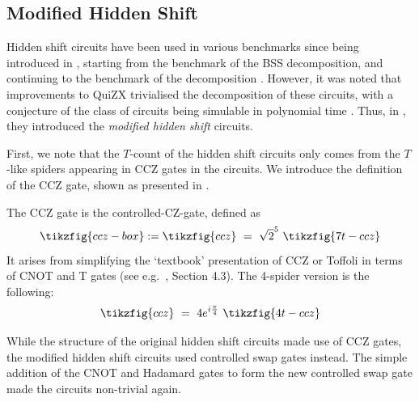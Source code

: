 
\subsection{Modified Hidden Shift}
\label{sec:modified-hidden-shift}

Hidden shift circuits have been used in various benchmarks since being introduced in \cite{Bravyi_2016bss},
starting from the benchmark of the BSS decomposition, 
and continuing to the benchmark of the  decomposition 
\cite{Bravyi_2019,Kissinger_2022,Kissinger2022cat,Peres_2023}.
However, it was noted that improvements to QuiZX trivialised the decomposition of these circuits,
with a conjecture of the class of circuits being simulable in polynomial time \cite{Codsi2022}.
Thus, in \cite{koch2023}, they introduced the \textit{modified hidden shift} circuits.

First, we note that the $T$-count of the hidden shift circuits only comes from
the $T$-like spiders appearing in CCZ gates in the circuits.
We introduce the definition of the CCZ gate, shown as presented in \cite{Kissinger_2022}.

\begin{definition}
    The CCZ gate is the controlled-CZ-gate, defined as
\begin{equation}\label{eq:7t-ccz}
\tikzfig{ccz-box} := \tikzfig{ccz} \ =\ 
\sqrt{2}^5\ 
\tikzfig{7t-ccz}
\end{equation}
It arises from simplifying the `textbook' presentation of CCZ or Toffoli in terms of CNOT and T gates 
(see e.g.~\cite{Nielsen_Chuang_2010}, Section 4.3). 
The 4-spider version is the following:
\begin{equation}\label{eq:4t-ccz}
\tikzfig{ccz} \ =\ 
4e^{i\frac\pi4}\ 
\tikzfig{4t-ccz}
\end{equation}
\end{definition}

While the structure of the original hidden shift circuits made use of CCZ gates,
the modified hidden shift circuits used controlled swap gates instead.
The simple addition of the CNOT and Hadamard gates to form the new controlled swap gate
made the circuits non-trivial again.

